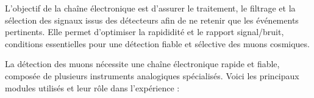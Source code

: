 \documentclass[a4paper,12pt,twoside]{article}
\begin{document}

\vspace{1em}
\begin{center}
\begin{tcolorbox}[colback=blue!5!white, colframe=blue!60!black, title=Principe de la chaîne électronique]
L’objectif de la chaîne électronique est d’assurer le traitement, le filtrage et la sélection des signaux issus des détecteurs afin de ne retenir que les événements pertinents. Elle permet d’optimiser la rapididité et le rapport signal/bruit, conditions essentielles pour une détection fiable et sélective des muons cosmiques.
\end{tcolorbox}
\end{center}


La détection des muons nécessite une chaîne électronique rapide et fiable, composée de plusieurs instruments analogiques spécialisés. Voici les principaux modules utilisés et leur rôle dans l’expérience :
\end{document}
